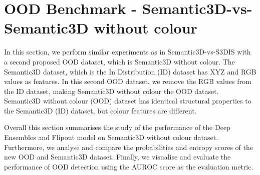     \section{OOD Benchmark - Semantic3D-vs-Semantic3D without colour}
    In this section, we perform similar experiments as in Semantic3D-vs-S3DIS with a second proposed OOD dataset, which is Semantic3D without colour.
    The Semantic3D dataset, which is the In Distribution (ID) dataset has XYZ and RGB values as features.
    In this second OOD dataset, we remove the RGB values from the ID dataset, making Semantic3D without colour the OOD dataset.
    Semantic3D without colour (OOD) dataset has identical structural properties to the Semantic3D (ID) dataset, but colour features are different.

    Overall this section summarises the study of the performance of the Deep Ensembles and Flipout model on Semantic3D without colour dataset.
    Furthermore, we analyse and compare the probabilities and entropy scores of the new OOD and Semantic3D dataset.
    Finally, we visualise and evaluate the performance of OOD detection using the AUROC score as the evaluation metric.

